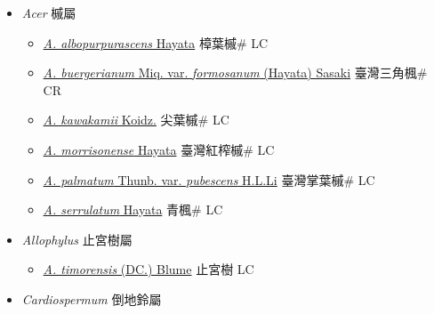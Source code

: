 
  \begin{itemize}
 \item[] \textit{Acer} 槭屬
                    
  \begin{itemize}
        \item[] \href{http://www.theplantlist.org/tpl1.1/search?q=Acer+albopurpurascens}{\textit{A. albopurpurascens} Hayata}   樟葉槭\# LC
        \item[] \href{http://www.theplantlist.org/tpl1.1/search?q=Acer+buergerianum+var.+formosanum}{\textit{A. buergerianum} Miq. var. \textit{formosanum} (Hayata) Sasaki}   臺灣三角楓\# CR
        \item[] \href{http://www.theplantlist.org/tpl1.1/search?q=Acer+kawakamii}{\textit{A. kawakamii} Koidz.}   尖葉槭\# LC
        \item[] \href{http://www.theplantlist.org/tpl1.1/search?q=Acer+morrisonense}{\textit{A. morrisonense} Hayata}   臺灣紅榨槭\# LC
        \item[] \href{http://www.theplantlist.org/tpl1.1/search?q=Acer+palmatum+var.+pubescens}{\textit{A. palmatum} Thunb. var. \textit{pubescens} H.L.Li}   臺灣掌葉槭\# LC
        \item[] \href{http://www.theplantlist.org/tpl1.1/search?q=Acer+serrulatum}{\textit{A. serrulatum} Hayata}   青楓\# LC
  \end{itemize}
 \item[] \textit{Allophylus} 止宮樹屬
                    
  \begin{itemize}
        \item[] \href{http://www.theplantlist.org/tpl1.1/search?q=Allophylus+timorensis}{\textit{A. timorensis} (DC.) Blume}   止宮樹 LC
  \end{itemize}
 \item[] \textit{Cardiospermum} 倒地鈴屬
                    

\end{itemize}
